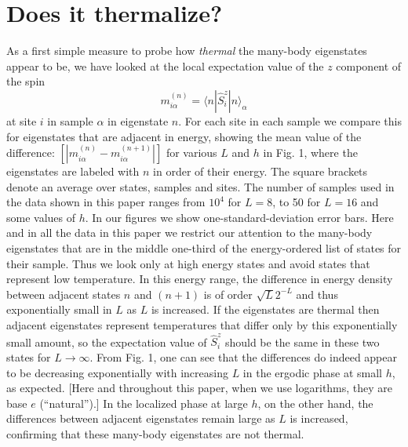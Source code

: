 \documentclass[letterpaper, twocolumn,superscriptaddress, showpacs,preprintnumbers,amsmath,amssymb]{revtex4}
\begin{document}


\section{Does it thermalize?}

As a first simple measure to probe how \emph{thermal} the many-body eigenstates appear to be,
we have looked at the local expectation value of the $z$ component of the spin
\begin{equation}
m^{(n)}_{i\alpha} = \langle n | \hat{S}_i^z | n \rangle_{\alpha}
\end{equation}
at site $i$ in sample $\alpha$ in eigenstate $n$.  For each site in each sample we compare this for eigenstates that are
adjacent in energy, showing the mean value of the difference:
$[|m^{(n)}_{i\alpha}-m^{(n+1)}_{i\alpha}|]$ for various $L$ and $h$ in Fig. 1,
where the eigenstates are labeled with $n$ in order of their energy.  The square brackets denote an average over states, samples and
sites.  The number of samples used in the data shown in this paper
ranges from $10^4$ for $L=8$, to 50 for $L=16$ and some values of $h$.
In our figures we show one-standard-deviation error bars.
Here and in all the data in this paper we restrict
our attention to the many-body eigenstates that are in the middle one-third of the
energy-ordered list of states for their sample.  Thus we look
only at high energy states and avoid states that represent low temperature.  In this energy range, the difference in energy density
between adjacent states $n$ and $(n+1)$ is of order $\sqrt{L }2^{-L}$ and thus exponentially small in $L$ as $L$ is increased.  If the
eigenstates are thermal then adjacent eigenstates represent temperatures that differ only by this exponentially small amount, so the expectation
value of $\hat{S}_i^z$ should be the same in these two states for $L\rightarrow\infty$.  From Fig. 1, one can see that the differences do indeed
appear to be decreasing exponentially with increasing $L$ in the ergodic phase at small $h$, as expected.
[Here and throughout this paper, when we use logarithms, they are base $e$ (``natural'').]
In the localized phase at large $h$, on the other hand, the differences between adjacent
eigenstates remain large as $L$ is increased, confirming that these many-body eigenstates are not thermal.
\end{document}

